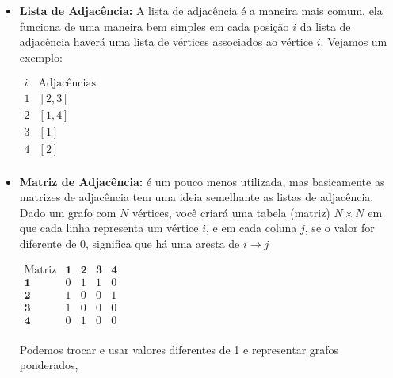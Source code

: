 \begin{itemize}
	\item \textbf{Lista de Adjacência: }A lista de adjacência é a maneira mais comum, ela funciona de uma maneira bem simples em cada posição $i$ da lista de adjacência haverá uma lista de vértices associados ao vértice $i$. Vejamos um exemplo:

	      \vspace{0.5cm}



	      \begin{center}
		      \centering
		      $
			      \begin{array}{c|l} %
				      i & \text{Adjacências} \\ %
				      \hline %
				      1 & [2, 3]             \\ %
				      2 & [1, 4]             \\
				      3 & [1]                \\
				      4 & [2]                \\
			      \end{array}
		      $
	      \end{center}
	      \vspace{0.5cm}

	\item\textbf{Matriz de Adjacência: }é um pouco menos utilizada, mas basicamente as matrizes de adjacência tem uma ideia semelhante as listas de adjacência. Dado um grafo com $N$ vértices, você criará uma tabela (matriz) $N \times N$ em que cada linha representa um vértice $i$, e em cada coluna $j$, se o valor for diferente de 0, significa que há uma aresta de $i \rightarrow j$
	      \begin{center}
		      $
			      \begin{array}{c|cccc}
				      \text{Matriz} & \mathbf{1} & \mathbf{2} & \mathbf{3} & \mathbf{4} \\
				      \hline
				      \mathbf{1}    & 0          & 1          & 1          & 0          \\
				      \mathbf{2}    & 1          & 0          & 0          & 1          \\
				      \mathbf{3}    & 1          & 0          & 0          & 0          \\
				      \mathbf{4}    & 0          & 1          & 0          & 0          \\
			      \end{array}
		      $
	      \end{center}

	      Podemos trocar e usar valores diferentes de 1 e representar grafos ponderados,

\end{itemize}

